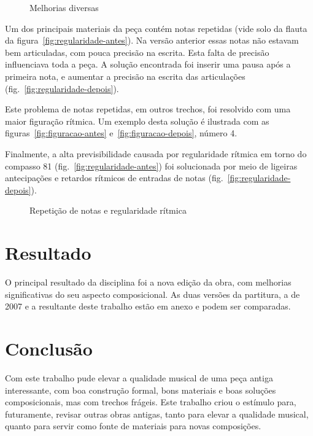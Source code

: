 \documentclass[10pt]{article}
\begin{document}
\begin{figure*}
  \centering

  \caption{Melhorias diversas}
  \label{fig:figuracao}
\end{figure*}

Um dos principais materiais da peça contém notas repetidas (vide solo
da flauta da figura~\ref{fig:regularidade-antes}). Na versão anterior
essas notas não estavam bem articuladas, com pouca precisão na
escrita. Esta falta de precisão influenciava toda a peça. A solução
encontrada foi inserir uma pausa após a primeira nota, e aumentar a
precisão na escrita das articulações
(fig.~\ref{fig:regularidade-depois}).

Este problema de notas repetidas, em outros trechos, foi resolvido com
uma maior figuração rítmica. Um exemplo desta solução é ilustrada com
as figuras~\ref{fig:figuracao-antes} e~\ref{fig:figuracao-depois},
número 4.

Finalmente, a alta previsibilidade causada por regularidade rítmica em
torno do compasso 81 (fig.~\ref{fig:regularidade-antes}) foi
solucionada por meio de ligeiras antecipações e retardos rítmicos de
entradas de notas (fig.~\ref{fig:regularidade-depois}).

\begin{figure*}
  \centering

  \caption{Repetição de notas e regularidade rítmica}
  \label{fig:regularidade}
\end{figure*}

\section{Resultado}
\label{sec:resultado}

O principal resultado da disciplina foi a nova edição da obra, com
melhorias significativas do seu aspecto composicional. As duas versões
da partitura, a de 2007 e a resultante deste trabalho estão em anexo e
podem ser comparadas.

\section{Conclusão}
\label{sec:conclusao}

Com este trabalho pude elevar a qualidade musical de uma peça antiga
interessante, com boa construção formal, bons materiais e boas
soluções composicionais, mas com trechos frágeis. Este trabalho criou
o estímulo para, futuramente, revisar outras obras antigas, tanto para
elevar a qualidade musical, quanto para servir como fonte de materiais
para novas composições.
\end{document}
